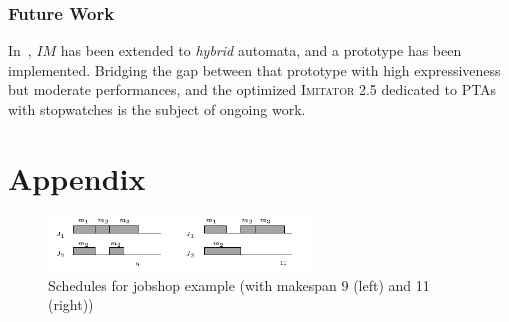 \documentclass{llncs}
\newcommand{\Ko}{K}
\newcommand{\IM}{\mathit{IM}}
\newcommand{\imitator}{\textsc{Imitator}}
\newcommand{\commentaire}[1]{\textcolor{red}{\textbf{$\Leftarrow$  #1 $\Rightarrow$}}}
\begin{document}
\subsubsection*{Future Work}
In~\cite{FK11}, $\IM$ has been extended to {\em hybrid} automata, and a prototype 
has been implemented.
Bridging the gap between that %
prototype with high expressiveness but moderate performances, and the optimized \imitator{} 2.5 dedicated to PTAs with stopwatches is the subject of ongoing work.







\newpage


\appendix

\section*{Appendix}






\begin{figure}[ht!]
	\centering
		\includegraphics[width=7cm]{scheduling.jpg}
	\caption{Schedules for jobshop example (with makespan 9 (left) and 11 (right)) \cite{AM02}}
	\label{fig:schedules_maler}
\end{figure}

\end{document}
